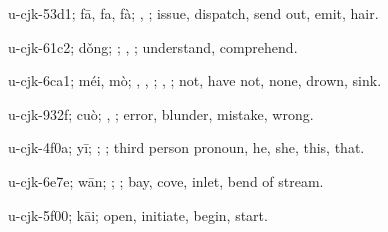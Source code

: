 \begin{multicols}{2}
{\cjkgGlue{}u-cjk-53d1; fā, fa, fà; \cjkgGlue{}, \cjkgGlue{}; issue, dispatch, send out, emit, hair.

\cjkgGlue{}u-cjk-61c2; dǒng; \cjkgGlue{}\cjkgGlue{}\cjkgGlue{}; \cjkgGlue{}, \cjkgGlue{}; understand, comprehend.

\cjkgGlue{}u-cjk-6ca1; méi, mò; \cjkgGlue{}\cjkgGlue{}\cjkgGlue{}, \cjkgGlue{}\cjkgGlue{}\cjkgGlue{}, \cjkgGlue{}; \cjkgGlue{}, \cjkgGlue{}; not, have not, none, drown, sink.

\cjkgGlue{}u-cjk-932f; cuò; \cjkgGlue{}, \cjkgGlue{}; error, blunder, mistake, wrong.

\cjkgGlue{}u-cjk-4f0a; yī; \cjkgGlue{}; \cjkgGlue{}; third person pronoun, he, she, this, that.

\cjkgGlue{}u-cjk-6e7e; wān; \cjkgGlue{}; \cjkgGlue{}; bay, cove, inlet, bend of stream.

\cjkgGlue{}u-cjk-5f00; kāi; open, initiate, begin, start.

}
\end{multicols}

